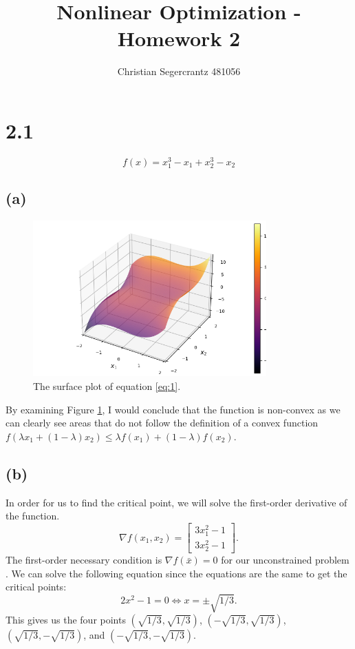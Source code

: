 \documentclass{article}
\title{Nonlinear Optimization - Homework 2 }
\author{Christian Segercrantz 481056}
\begin{document}
	\maketitle
	\pagebreak
\section*{2.1}
\begin{equation} \label{eq:1}
	f(x) = x_1^3-x_1+x_2^3-x_2
\end{equation}
\subsection*{(a)}
	\begin{figure}[H]
		\includegraphics[width=0.8\textwidth]{H21_surface.png}
		\caption{The surface plot of equation \eqref{eq:1}.}
		\label{fig:1a}
	\end{figure}
	By examining Figure \ref{fig:1a}, I would conclude that the function is non-convex as we can clearly see areas that do not follow the definition of a convex function $f(\lambda x_1 + (1 - \lambda)x_2 ) \leq \lambda f(x_1 ) + (1 - \lambda)f(x_2)$.
\subsection*{(b)}
	In order for us to find the critical point, we will solve the first-order derivative of the function.
	\begin{equation}
		\nabla f(x_1,x_2) =
		\begin{bmatrix}
			3x_1^2-1 \\
			3x_2^2-1
		\end{bmatrix}.
	\end{equation}
	The first-order necessary condition is $\nabla f(\bar{x}) = 0$ for our unconstrained problem . We can solve the following equation since the equations are the same to get the critical points:
	\begin{equation}
		2x^2-1 = 0 \iff x= \pm\sqrt{1/3}.
	\end{equation}
	This gives us the four points $(\sqrt{1/3},\sqrt{1/3})$, $(-\sqrt{1/3},\sqrt{1/3})$, $(\sqrt{1/3},-\sqrt{1/3})$, and $(-\sqrt{1/3},-\sqrt{1/3})$.
\end{document}
